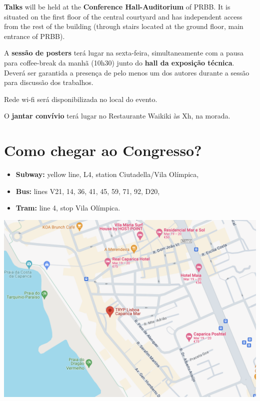 \textbf{Talks} will be held at the \textbf{Conference Hall-Auditorium} of PRBB. It is situated on the first floor of the central courtyard and
has independent access from the rest of the building (through stairs located at the ground floor, main entrance of PRBB). 

A \textbf{sessão de posters} terá lugar na sexta-feira, simultaneamente com a pausa para coffee-break da manhã (10h30) junto do \textbf{hall da exposição técnica}. Deverá ser garantida a presença de pelo menos um dos autores durante a sessão para discussão dos trabalhos.

Rede wi-fi será disponibilizada no local do evento.

O \textbf{jantar convívio} terá lugar no Restaurante Waikiki às Xh, na morada.

\section{Como chegar ao Congresso?}



\begin{itemize}

	\item \textbf{Subway:} yellow line, L4, station Ciutadella/Vila Ol\'{i}mpica,
	\item \textbf{Bus:} lines V21, 14, 36, 41, 45, 59, 71, 92, D20,
	\item \textbf{Tram:} line 4, stop Vila Ol\'{i}mpica.
	
\end{itemize}

\begin{center}
\includegraphics[width=\linewidth]{images/tryp_map}
\end{center}
